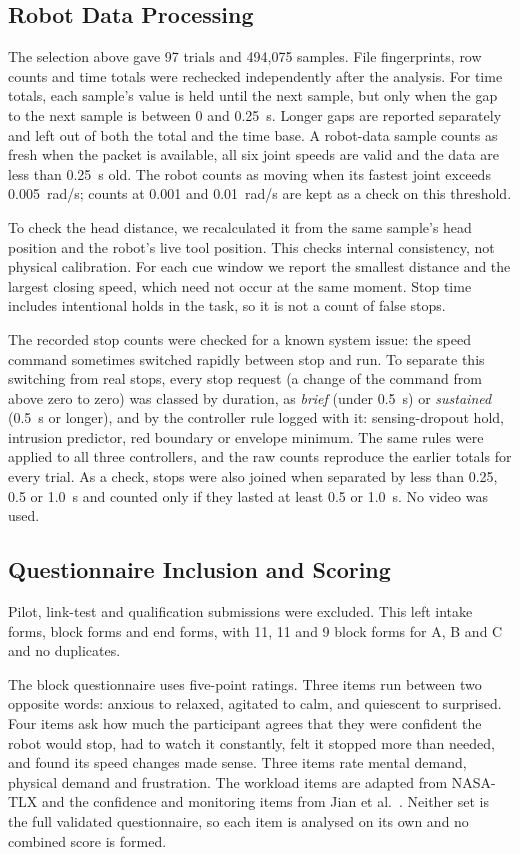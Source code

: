 \documentclass{IEEEtran}
\newcommand{\aidraft}[1]{#1}
\begin{document}
\subsection{Robot Data Processing}
\label{sec:telemetry}
The selection above gave 97 trials and 494,075 samples. File fingerprints,
row counts and time totals were rechecked independently after the analysis.
For time totals, each sample's value is held until the next sample, but only
when the gap to the next sample is between 0 and 0.25~s. Longer gaps are
reported separately and left out of both the total and the time base. A
robot-data sample counts as fresh when the packet is available, all six joint
speeds are valid and the data are less than 0.25~s old. The robot counts as
moving when its fastest joint exceeds 0.005~rad/s; counts at 0.001 and
0.01~rad/s are kept as a check on this threshold.

To check the head distance, we recalculated it from the same sample's head
position and the robot's live tool position. This checks internal
consistency, not physical calibration. For each cue window we report the
smallest distance and the largest closing speed, which need not occur at the
same moment. Stop time includes intentional holds in the task, so it is not a
count of false stops.

\aidraft{The recorded stop counts were checked for a known system issue: the speed
command sometimes switched rapidly between stop and run. To separate this
switching from real stops, every stop request (a change of the command from
above zero to zero) was classed by duration, as \emph{brief} (under 0.5~s) or
\emph{sustained} (0.5~s or longer), and by the controller rule logged with it:
sensing-dropout hold, intrusion predictor, red boundary or envelope minimum.
The same rules were applied to all three controllers, and the raw counts
reproduce the earlier totals for every trial. As a check, stops were also
joined when separated by less than 0.25, 0.5 or 1.0~s and counted only if they
lasted at least 0.5 or 1.0~s. No video was used.}

\subsection{Questionnaire Inclusion and Scoring}
Pilot, link-test and qualification submissions were excluded. This left
\IntakeCodes{} intake forms, \BlockResponses{} block forms and
\FollowupCodes{} end forms, with 11, 11 and 9 block forms for A, B and C and no
duplicates.

The block questionnaire uses five-point ratings. Three items run between two
opposite words: anxious to relaxed, agitated to calm, and quiescent to
surprised. Four items ask how much the participant agrees that they were
confident the robot would stop, had to watch it constantly, felt it stopped
more than needed, and found its speed changes made sense. Three items rate
mental demand, physical demand and frustration. The workload items are adapted
from NASA-TLX \cite{hart1988tlx} and the confidence and monitoring items from
Jian et al.\ \cite{jian2000trust}. Neither set is the full validated
questionnaire, so each item is analysed on its own and no combined score is
formed.
\end{document}
